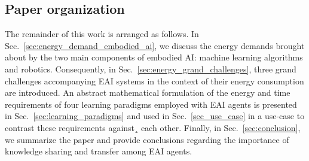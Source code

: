 \subsection{Paper organization}
The remainder of this work is arranged as follows. In Sec.~\ref{sec:energy_demand_embodied_ai}, we discuss the energy demands brought about by the two main components of embodied AI: machine learning algorithms and robotics. Consequently, in Sec.~\ref{sec:energy_grand_challenges}, three grand challenges accompanying EAI systems in the context of their energy consumption are introduced. An abstract mathematical formulation of the energy and time requirements of four learning paradigms employed with EAI agents is presented in Sec.~\ref{sec:learning_paradigms} and used in Sec.~\ref{sec_use_case} in a use-case to contrast these requirements against¸ each other. Finally, in Sec.~\ref{sec:conclusion}, we summarize the paper and provide conclusions regarding the importance of knowledge sharing and transfer among EAI agents. 